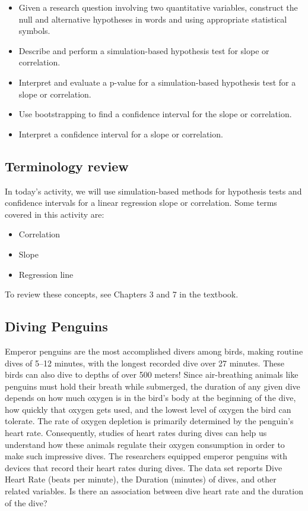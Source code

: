 \documentclass[
]{report}
\begin{document}
\begin{itemize}
\item
  Given a research question involving two quantitative variables, construct the null and alternative hypotheses
  in words and using appropriate statistical symbols.
\item
  Describe and perform a simulation-based hypothesis test for slope or correlation.
\item
  Interpret and evaluate a p-value for a simulation-based hypothesis test for a slope or correlation.
\item
  Use bootstrapping to find a confidence interval for the slope or correlation.
\item
  Interpret a confidence interval for a slope or correlation.
\end{itemize}

\hypertarget{terminology-review-20}{%
\subsection{Terminology review}\label{terminology-review-20}}

In today's activity, we will use simulation-based methods for hypothesis tests and confidence intervals for a linear regression slope or correlation. Some terms covered in this activity are:

\begin{itemize}
\item
  Correlation
\item
  Slope
\item
  Regression line
\end{itemize}

To review these concepts, see Chapters 3 and 7 in the textbook.

\hypertarget{diving-penguins}{%
\subsection{Diving Penguins}\label{diving-penguins}}

Emperor penguins are the most accomplished divers among birds, making routine dives of 5--12 minutes, with the longest recorded dive over 27 minutes. These birds can also dive to depths of over 500 meters! Since air-breathing animals like penguins must hold their breath while submerged, the duration of any given dive depends on how much oxygen is in the bird's body at the beginning of the dive, how quickly that oxygen gets used, and the lowest level of oxygen the bird can tolerate. The rate of oxygen depletion is primarily determined by the penguin's heart rate. Consequently, studies of heart rates during dives can help us understand how these animals regulate their oxygen consumption in order to make such impressive dives. The researchers equipped emperor penguins with devices that record their heart rates during dives. The data set reports Dive Heart Rate (beats per minute), the Duration (minutes) of dives, and other related variables. Is there an association between dive heart rate and the duration of the dive?
\end{document}
